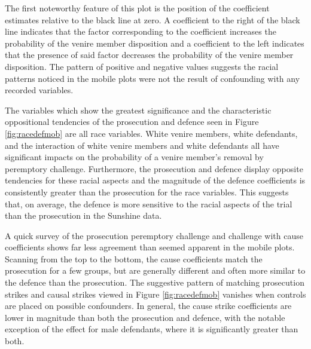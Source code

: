 \documentclass[12pt]{article}
\begin{document}

The first noteworthy feature of this plot is the position of the coefficient estimates relative to the black line at zero. A coefficient to the right of the black line indicates that the factor corresponding to the coefficient increases the probability of the venire member disposition and a coefficient to the left indicates that the presence of said factor decreases the probability of the venire member disposition. The pattern of positive and negative values suggests the racial patterns noticed in the mobile plots were not the result of confounding with any recorded variables.

The variables which show the greatest significance and the characteristic oppositional tendencies of the prosecution and defence seen in Figure \ref{fig:racedefmob} are all race variables. White venire members, white defendants, and the interaction of white venire members and white defendants all have significant impacts on the probability of a venire member's removal by peremptory challenge. Furthermore, the prosecution and defence display opposite tendencies for these racial aspects and the magnitude of the defence coefficients is consistently greater than the prosecution for the race variables. This suggests that, on average, the defence is more sensitive to the racial aspects of the trial than the prosecution in the Sunshine data.

A quick survey of the prosecution peremptory challenge and challenge with cause coefficients shows far less agreement than seemed apparent in the mobile plots. Scanning from the top to the bottom, the cause coefficients match the prosecution for a few groups, but are generally different and often more similar to the defence than the prosecution. The suggestive pattern of matching prosecution strikes and causal strikes viewed in Figure \ref{fig:racedefmob} vanishes when controls are placed on possible confounders. In general, the cause strike coefficients are lower in magnitude than both the prosecution and defence, with the notable exception of the effect for male defendants, where it is significantly greater than both.
\end{document}
